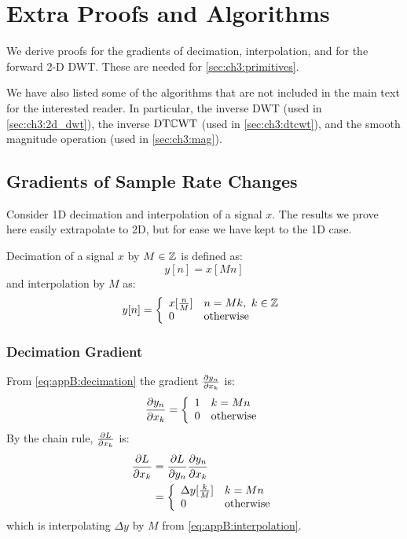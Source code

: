 \chapter{Extra Proofs and Algorithms} \label{appB:extra}
\def \path {dtcwt_scat/}
\def \imgpath {dtcwt_scat/images}
We derive proofs for the gradients of decimation, interpolation, and 
for the forward 2-D DWT. These are needed for \autoref{sec:ch3:primitives}.

We have also listed some of the algorithms that are not
included in the main text for the interested reader. In particular, 
the inverse DWT (used in \autoref{sec:ch3:2d_dwt}), the inverse $\mathrm{DT}\mathbb{C}\mathrm{WT}$ (used in
\autoref{sec:ch3:dtcwt}), and the smooth magnitude operation (used in
\autoref{sec:ch3:mag}).

\section{Gradients of Sample Rate Changes}\label{sec:appB:samplegrads}
Consider 1D decimation and interpolation of a signal $x$. The results we prove
here easily extrapolate to 2D, but for ease we have kept to the 1D case. 

Decimation of a signal $x$ by $M \in \mathbb{Z}^{}$ is defined as:
\begin{equation}
  y[n] = x[Mn] \label{eq:appB:decimation}
\end{equation}
and interpolation by $M$ as:
\begin{equation}
  y[n] = \left\{ \begin{array}{ll}
    x[\frac{n}{M}] & n = Mk,\ k\in \mathbb{Z}^{} \\
    0 & \text{otherwise} \\ 
  \end{array}\right.
  \label{eq:appB:interpolation}
\end{equation}

\subsection{Decimation Gradient}
From \eqref{eq:appB:decimation} the gradient $\frac{\partial y_n}{\partial x_k}$ is: 
\begin{equation}
  \frac{\partial y_n}{\partial x_k} = \left\{ \begin{array}{ll}
    1 & k = Mn \\
    0 & \text{otherwise} \\
  \end{array} \right.
\end{equation}
By the chain rule, $\frac{\partial L}{\partial x_k}$ is:
\begin{align}
  \frac{\partial L}{\partial x_k} &= \frac{\partial L}{\partial y_n}\frac{\partial y_n}{\partial x_k} \\
                &= \left\{ \begin{array}{ll} 
                \Delta y[\frac{k}{M}] & k = Mn\\
                  0 & \text{otherwise} \\
                \end{array}\right.
\end{align}
which is interpolating $\Delta y$ by $M$ from \eqref{eq:appB:interpolation}.

